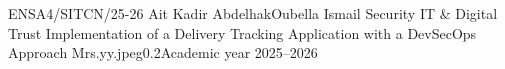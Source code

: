 \begin{titlepage}
\pagedegarde
{ENSA4/SITCN/25-26}
{}{Ait Kadir Abdelhak}{Oubella Ismail}
{Security IT \& Digital Trust}
{Implementation of a Delivery Tracking Application with a DevSecOps Approach}
{}{Mrs.}{yy.jpeg}{0.2}{}{}{Academic year 2025--2026}
\end{titlepage}
\restoregeometry
